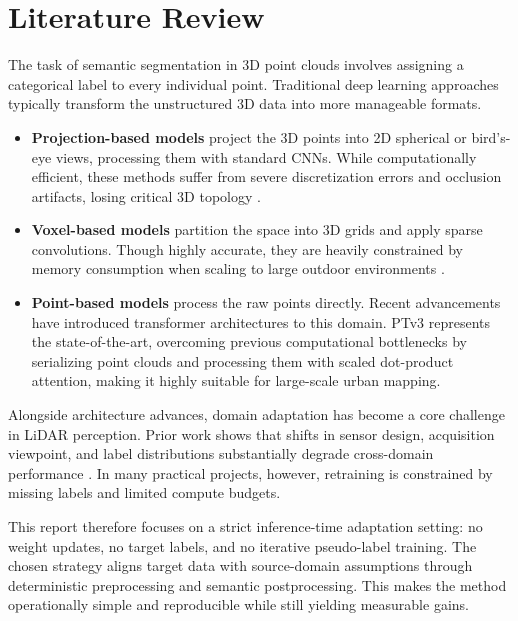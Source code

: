 \documentclass[12pt, a4paper]{report}
\begin{document}
\chapter{Literature Review}
The task of semantic segmentation in 3D point clouds involves assigning a categorical label to every individual point. Traditional deep learning approaches typically transform the unstructured 3D data into more manageable formats.

\begin{itemize}
    \item \textbf{Projection-based models} project the 3D points into 2D spherical or bird's-eye views, processing them with standard \acp{CNN}. While computationally efficient, these methods suffer from severe discretization errors and occlusion artifacts, losing critical 3D topology \cite{milioto2019rangenet}.

    \item \textbf{Voxel-based models} partition the space into 3D grids and apply sparse convolutions. Though highly accurate, they are heavily constrained by memory consumption when scaling to large outdoor environments \cite{choy20194d}.

    \item \textbf{Point-based models} process the raw points directly. Recent advancements have introduced transformer architectures to this domain. \ac{PTv3} \cite{wu2024ptv3} represents the state-of-the-art, overcoming previous computational bottlenecks by serializing point clouds and processing them with scaled dot-product attention, making it highly suitable for large-scale urban mapping.
\end{itemize}

Alongside architecture advances, domain adaptation has become a core challenge in LiDAR perception. Prior work shows that shifts in sensor design, acquisition viewpoint, and label distributions substantially degrade cross-domain performance \cite{wang2020domain}. In many practical projects, however, retraining is constrained by missing labels and limited compute budgets.

This report therefore focuses on a strict inference-time adaptation setting: no weight updates, no target labels, and no iterative pseudo-label training. The chosen strategy aligns target data with source-domain assumptions through deterministic preprocessing and semantic postprocessing. This makes the method operationally simple and reproducible while still yielding measurable gains.
\end{document}
